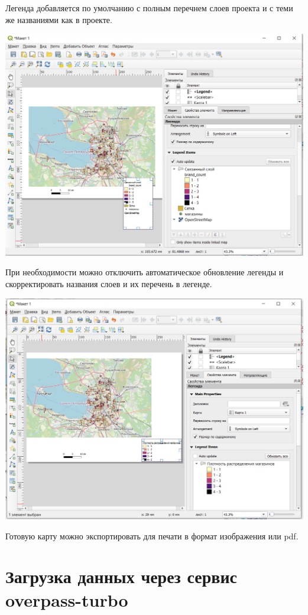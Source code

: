 \documentclass[
]{book}
\begin{document}
Легенда добавляется по умолчанию с полным перечнем слоев проекта и с теми же названиями как в проекте.

\includegraphics{figures/30.PNG}

При необходимости можно отключить автоматическое обновление легенды и скорректировать названия слоев и их перечень в легенде.

\includegraphics{figures/31.PNG}

Готовую карту можно экспортировать для печати в формат изображения или pdf.

\hypertarget{ux437ux430ux433ux440ux443ux437ux43aux430-ux434ux430ux43dux43dux44bux445-ux447ux435ux440ux435ux437-ux441ux435ux440ux432ux438ux441-overpass-turbo}{%
\chapter{Загрузка данных через сервис overpass-turbo}\label{ux437ux430ux433ux440ux443ux437ux43aux430-ux434ux430ux43dux43dux44bux445-ux447ux435ux440ux435ux437-ux441ux435ux440ux432ux438ux441-overpass-turbo}}
\end{document}
